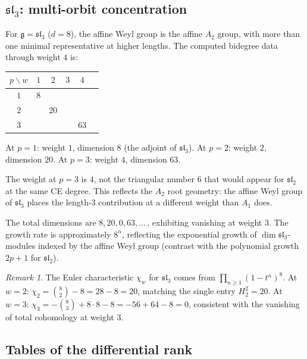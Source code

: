 \documentclass[11pt,reqno]{amsart}
\theoremstyle{plain}
\theoremstyle{definition}
\theoremstyle{remark}
\newtheorem{remark}[theorem]{Remark}
\newcommand{\fg}{\mathfrak{g}}
\begin{document}
\subsection{$\mathfrak{sl}_3$: multi-orbit concentration}
\label{sec:sl3}

For $\fg = \mathfrak{sl}_3$ ($d = 8$), the affine Weyl group is the affine
$A_2$ group, with more than one minimal representative at higher lengths.
The computed bidegree data through weight $4$ is:

\begin{center}
 \begin{tabular}{c|ccccc}
 \toprule
 $p \backslash w$ & $1$ & $2$ & $3$ & $4$ \\
 \midrule
 $1$ & $8$ & & & \\
 $2$ & & $20$ & & \\
 $3$ & & & & $63$ \\
 \bottomrule
 \end{tabular}
\end{center}

\noindent
At $p = 1$: weight $1$, dimension $8$ (the adjoint of $\mathfrak{sl}_3$).
At $p = 2$: weight $2$, dimension $20$.
At $p = 3$: weight $4$, dimension $63$.

The weight at $p = 3$ is $4$, not the triangular number $6$ that would
appear for $\mathfrak{sl}_2$ at the same CE degree. This reflects the
$A_2$ root geometry: the affine Weyl group of $\mathfrak{sl}_3$ places the
length-$3$ contribution at a different weight than $A_1$ does.

The total dimensions are $8, 20, 0, 63, \ldots$\,, exhibiting vanishing at
weight $3$. The growth rate is approximately $8^n$, reflecting the
exponential growth of $\dim \mathfrak{sl}_3$-modules indexed by the affine
Weyl group (contrast with the polynomial growth $2p + 1$ for
$\mathfrak{sl}_2$).

\begin{remark}\label{rem:euler-sl3}
 The Euler characteristic $\chi_w$ for $\mathfrak{sl}_3$ comes from
 $\prod_{n \ge 1}(1 - t^n)^8$. At $w = 2$: $\chi_2 = \binom{8}{2} - 8 =
 28 - 8 = 20$, matching the single entry $H^2_2 = 20$. At $w = 3$:
 $\chi_3 = -\binom{8}{3} + 8 \cdot 8 - 8 = -56 + 64 - 8 = 0$, consistent
 with the vanishing of total cohomology at weight $3$.
\end{remark}


\subsection{Tables of the differential rank}
\label{sec:tables}
\end{document}
